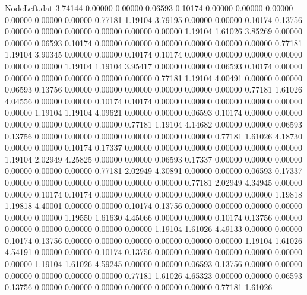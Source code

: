 \begin{filecontents}{NodeLeft.dat}
   3.74144    0.00000    0.00000     0.06593    0.10174    0.00000    0.00000    0.00000    0.00000    0.00000    0.00000    0.77181    1.19104
   3.79195    0.00000    0.00000     0.10174    0.13756    0.00000    0.00000    0.00000    0.00000    0.00000    0.00000    1.19104    1.61026
   3.85269    0.00000    0.00000     0.06593    0.10174    0.00000    0.00000    0.00000    0.00000    0.00000    0.00000    0.77181    1.19104
   3.90345    0.00000    0.00000     0.10174    0.10174    0.00000    0.00000    0.00000    0.00000    0.00000    0.00000    1.19104    1.19104
   3.95417    0.00000    0.00000     0.06593    0.10174    0.00000    0.00000    0.00000    0.00000    0.00000    0.00000    0.77181    1.19104
   4.00491    0.00000    0.00000     0.06593    0.13756    0.00000    0.00000    0.00000    0.00000    0.00000    0.00000    0.77181    1.61026
   4.04556    0.00000    0.00000     0.10174    0.10174    0.00000    0.00000    0.00000    0.00000    0.00000    0.00000    1.19104    1.19104
   4.09621    0.00000    0.00000     0.06593    0.10174    0.00000    0.00000    0.00000    0.00000    0.00000    0.00000    0.77181    1.19104
   4.14682    0.00000    0.00000     0.06593    0.13756    0.00000    0.00000    0.00000    0.00000    0.00000    0.00000    0.77181    1.61026
   4.18730    0.00000    0.00000     0.10174    0.17337    0.00000    0.00000    0.00000    0.00000    0.00000    0.00000    1.19104    2.02949
   4.25825    0.00000    0.00000     0.06593    0.17337    0.00000    0.00000    0.00000    0.00000    0.00000    0.00000    0.77181    2.02949
   4.30891    0.00000    0.00000     0.06593    0.17337    0.00000    0.00000    0.00000    0.00000    0.00000    0.00000    0.77181    2.02949
   4.34945    0.00000    0.00000     0.10174    0.10174    0.00000    0.00000    0.00000    0.00000    0.00000    0.00000    1.19818    1.19818
   4.40001    0.00000    0.00000     0.10174    0.13756    0.00000    0.00000    0.00000    0.00000    0.00000    0.00000    1.19550    1.61630
   4.45066    0.00000    0.00000     0.10174    0.13756    0.00000    0.00000    0.00000    0.00000    0.00000    0.00000    1.19104    1.61026
   4.49133    0.00000    0.00000     0.10174    0.13756    0.00000    0.00000    0.00000    0.00000    0.00000    0.00000    1.19104    1.61026
   4.54191    0.00000    0.00000     0.10174    0.13756    0.00000    0.00000    0.00000    0.00000    0.00000    0.00000    1.19104    1.61026
   4.59245    0.00000    0.00000     0.06593    0.13756    0.00000    0.00000    0.00000    0.00000    0.00000    0.00000    0.77181    1.61026
   4.65323    0.00000    0.00000     0.06593    0.13756    0.00000    0.00000    0.00000    0.00000    0.00000    0.00000    0.77181    1.61026

\end{filecontents}
